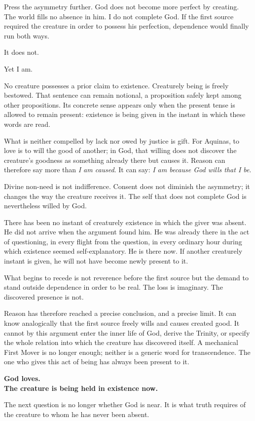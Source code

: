 Press the asymmetry further. God does not become more perfect by creating. The world fills no absence in him. I do not complete God. If the first source required the creature in order to possess his perfection, dependence would finally run both ways.

It does not.

Yet I am.

No creature possesses a prior claim to existence. Creaturely being is freely bestowed. That sentence can remain notional, a proposition safely kept among other propositions. Its concrete sense appears only when the present tense is allowed to remain present: existence is being given in the instant in which these words are read.

What is neither compelled by lack nor owed by justice is gift. For Aquinas, to love is to will the good of another; in God, that willing does not discover the creature's goodness as something already there but causes it. Reason can therefore say more than \emph{I am caused}. It can say: \emph{I am because God wills that I be}.

Divine non-need is not indifference. Consent does not diminish the asymmetry; it changes the way the creature receives it. The self that does not complete God is nevertheless willed by God.

There has been no instant of creaturely existence in which the giver was absent. He did not arrive when the argument found him. He was already there in the act of questioning, in every flight from the question, in every ordinary hour during which existence seemed self-explanatory. He is there now. If another creaturely instant is given, he will not have become newly present to it.

What begins to recede is not reverence before the first source but the demand to stand outside dependence in order to be real. The loss is imaginary. The discovered presence is not.

Reason has therefore reached a precise conclusion, and a precise limit. It can know analogically that the first source freely wills and causes created good. It cannot by this argument enter the inner life of God, derive the Trinity, or specify the whole relation into which the creature has discovered itself. A mechanical First Mover is no longer enough; neither is a generic word for transcendence. The one who gives this act of being has always been present to it.

\enlargethispage{\baselineskip}
\vspace{0.2\baselineskip}
\begin{center}
\bfseries God loves.\\[0.55em]
\normalfont The creature is being held in existence now.
\end{center}

\vspace{0.2\baselineskip}
The next question is no longer whether God is near. It is what truth requires of the creature to whom he has never been absent.
